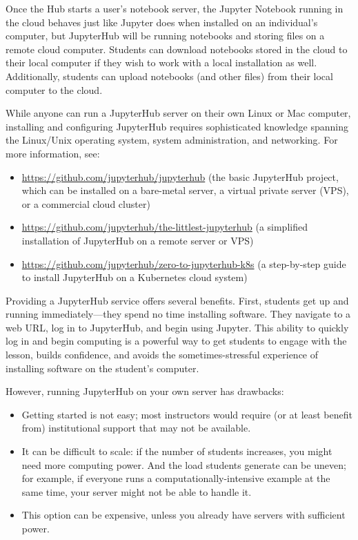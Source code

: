 \documentclass[]{book}
\begin{document}
Once the Hub starts a user's notebook server, the Jupyter Notebook
running in the cloud behaves just like Jupyter does when installed on an
individual's computer, but JupyterHub will be running notebooks and
storing files on a remote cloud computer. Students can download
notebooks stored in the cloud to their local computer if they wish to
work with a local installation as well. Additionally, students can
upload notebooks (and other files) from their local computer to the
cloud.

While anyone can run a JupyterHub server on their own Linux or Mac
computer, installing and configuring JupyterHub requires sophisticated
knowledge spanning the Linux/Unix operating system, system
administration, and networking. For more information, see:

\begin{itemize}
\item
  \url{https://github.com/jupyterhub/jupyterhub} (the basic JupyterHub
  project, which can be installed on a bare-metal server, a virtual
  private server (VPS), or a commercial cloud cluster)
\item
  \url{https://github.com/jupyterhub/the-littlest-jupyterhub} (a
  simplified installation of JupyterHub on a remote server or VPS)
\item
  \url{https://github.com/jupyterhub/zero-to-jupyterhub-k8s} (a
  step-by-step guide to install JupyterHub on a Kubernetes cloud system)
\end{itemize}

Providing a JupyterHub service offers several benefits. First, students
get up and running immediately---they spend no time installing software.
They navigate to a web URL, log in to JupyterHub, and begin using
Jupyter. This ability to quickly log in and begin computing is a
powerful way to get students to engage with the lesson, builds
confidence, and avoids the sometimes-stressful experience of installing
software on the student's computer.

However, running JupyterHub on your own server has drawbacks:

\begin{itemize}
\item
  Getting started is not easy; most instructors would require (or at
  least benefit from) institutional support that may not be available.
\item
  It can be difficult to scale: if the number of students increases, you
  might need more computing power. And the load students generate can be
  uneven; for example, if everyone runs a computationally-intensive
  example at the same time, your server might not be able to handle it.
\item
  This option can be expensive, unless you already have servers with
  sufficient power.
\end{itemize}
\end{document}
